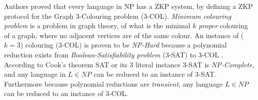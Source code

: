 Authors \cite{GMW} proved that every language in NP has a ZKP system, by defining a ZKP protocol for the Graph 3-Colouring problem (3-COL).
\textit{Minimum colouring problem} is a problem in graph theory, of what is the minimal $k$ \textit{proper} colouring of a graph, where no adjacent vertices are of the same colour.
An instance of ($k=3$) colouring (3-COL) is proven to be \textit{NP-Hard} because a polynomial reduction exists from \textit{Boolean-Satisfiability problem} (3-SAT) to 3-COL \cite{mouatadid2014introduction}.
According to Cook's theorem \cite{cook1971complexity} SAT or its 3 literal instance 3-SAT is \textit{NP-Complete}, and any language in $L \in NP$ can be reduced to an instance of 3-SAT. 
Furthermore because polynomial reductions are \textit{transient}, any language $L \in NP$ can be reduced to an instance of 3-COL.

%
%

